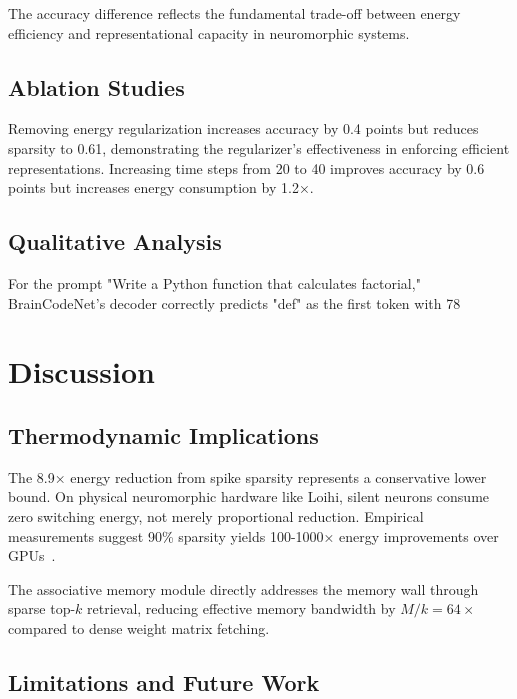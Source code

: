 \documentclass[11pt,a4paper]{article}
\begin{document}


The accuracy difference reflects the fundamental trade-off between energy efficiency and representational capacity in neuromorphic systems.

\subsection{Ablation Studies}

Removing energy regularization increases accuracy by 0.4 points but reduces sparsity to 0.61, demonstrating the regularizer's effectiveness in enforcing efficient representations. Increasing time steps from 20 to 40 improves accuracy by 0.6 points but increases energy consumption by 1.2×.

\subsection{Qualitative Analysis}

For the prompt "Write a Python function that calculates factorial," BrainCodeNet's decoder correctly predicts "def" as the first token with 78%

\section{Discussion}

\subsection{Thermodynamic Implications}

The 8.9× energy reduction from spike sparsity represents a conservative lower bound. On physical neuromorphic hardware like Loihi, silent neurons consume zero switching energy, not merely proportional reduction. Empirical measurements suggest 90\% sparsity yields 100-1000× energy improvements over GPUs~\citep{davies2018loihi}.

The associative memory module directly addresses the memory wall through sparse top-$k$ retrieval, reducing effective memory bandwidth by $M/k = 64×$ compared to dense weight matrix fetching.

\subsection{Limitations and Future Work}
\end{document}
